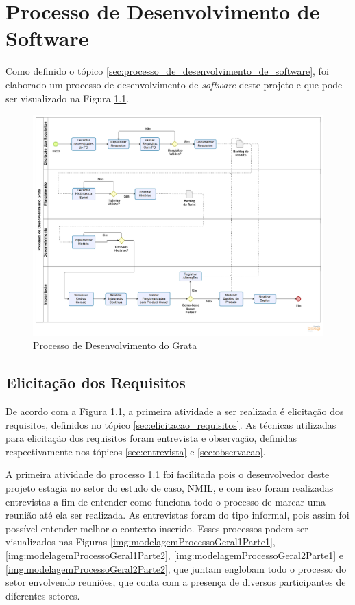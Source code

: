 \chapter[Processo de Desenvolvimento de Software]{Processo de Desenvolvimento de Software}
\label{cp:processo_de_desenvolvimento}

Como definido o tópico \ref{sec:processo_de_desenvolvimento_de_software}, foi elaborado um processo de desenvolvimento de \textit{software} deste projeto e que pode ser visualizado na Figura \ref{img:processo_de_desenvolvimento}.

\begin{figure}[H]
	\centering
	\includegraphics[width=1.0\textwidth]{figuras/processo_de_desenvolvimento.png}
	\caption{Processo de Desenvolvimento do Grata}
	\label{img:processo_de_desenvolvimento}
\end{figure}

\section{Elicitação dos Requisitos}

De acordo com a Figura \ref{img:processo_de_desenvolvimento}, a primeira atividade a ser realizada é elicitação dos requisitos, definidos no tópico \ref{sec:elicitacao_requisitos}. As técnicas utilizadas para elicitação dos requisitos foram entrevista e observação, definidas respectivamente nos tópicos \ref{sec:entrevista} e \ref{sec:observacao}. 

A primeira atividade do processo \ref{img:processo_de_desenvolvimento} foi facilitada pois o desenvolvedor deste projeto estagia no setor do estudo de caso, NMIL, e com isso foram realizadas entrevistas a fim de entender como funciona todo o processo de marcar uma reunião até ela ser realizada. As entrevistas foram do tipo informal, pois assim foi possível entender melhor o contexto inserido. Esses processos podem ser visualizados nas Figuras \ref{img:modelagemProcessoGeral1Parte1}, \ref{img:modelagemProcessoGeral1Parte2}, \ref{img:modelagemProcessoGeral2Parte1} e \ref{img:modelagemProcessoGeral2Parte2}, que juntam englobam todo o processo do setor envolvendo reuniões, que conta com a presença de diversos participantes de diferentes setores.

